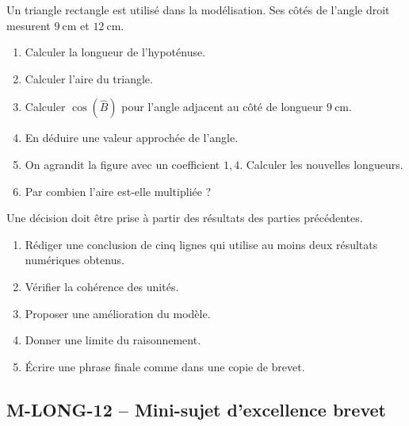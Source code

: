 \documentclass[11pt,a4paper]{article}
\newcounter{exercice}
\begin{document}
\begin{exercice}
Un triangle rectangle est utilisé dans la modélisation. Ses côtés de l'angle droit mesurent $9\ \mathrm{cm}$ et $12\ \mathrm{cm}$.
\begin{enumerate}
  \item Calculer la longueur de l'hypoténuse.
  \item Calculer l'aire du triangle.
  \item Calculer $\cos(\widehat{B})$ pour l'angle adjacent au côté de longueur $9\ \mathrm{cm}$.
  \item En déduire une valeur approchée de l'angle.
  \item On agrandit la figure avec un coefficient $1{,}4$. Calculer les nouvelles longueurs.
  \item Par combien l'aire est-elle multipliée ?
\end{enumerate}
\end{exercice}

\begin{exercice}
Une décision doit être prise à partir des résultats des parties précédentes.
\begin{enumerate}
  \item Rédiger une conclusion de cinq lignes qui utilise au moins deux résultats numériques obtenus.
  \item Vérifier la cohérence des unités.
  \item Proposer une amélioration du modèle.
  \item Donner une limite du raisonnement.
  \item Écrire une phrase finale comme dans une copie de brevet.
\end{enumerate}
\end{exercice}
\newpage
\subsection{M-LONG-12 -- Mini-sujet d'excellence brevet}
\end{document}
